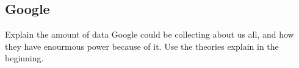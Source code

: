 \subsection{Google}
Explain the amount of data Google could be collecting about us all, and how they have enourmous power because of it. Use the theories explain in the beginning.
